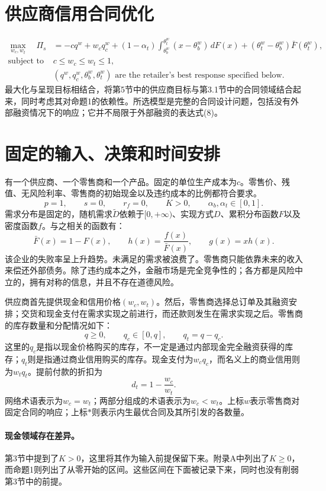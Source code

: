 \documentclass{article}
\begin{document}
\section*{供应商信用合同优化}
\begin{equation}
\begin{aligned}
\max_{w_c,w_t}\quad \Pi_s
&=-cq^w+w_cq_c^w
 +(1-\alpha_t)\int_{\theta_b^w}^{\theta_t^w}(x-\theta_b^w)\,dF(x)
 +(\theta_t^w-\theta_b^w)\bar F(\theta_t^w),\\
\text{subject to}\quad &c\leq w_c\leq w_t\leq 1,\\
&(q^w,q_c^w,\theta_b^w,\theta_t^w)
 \text{ are the retailer's best response specified below.}
\end{aligned}\tag{7}
\end{equation}
最大化与呈现目标相结合，将第5节中的供应商目标与第3.1节中的合同领域结合起来，同时考虑其对命题1的依赖性。所选模型是完整的合同设计问题，包括没有外部融资情况下的响应；它并不局限于外部融资的表达式(8)。

\section*{固定的输入、决策和时间安排}
有一个供应商、一个零售商和一个产品。固定的单位生产成本为$c$。零售价、残值、无风险利率、零售商的初始现金以及违约成本的比例都符合要求。
\[
p=1,\qquad s=0,\qquad r_f=0,\qquad K>0,\qquad
\alpha_b,\alpha_t\in[0,1].
\]
需求分布是固定的，随机需求$\widetilde D$依赖于$[0,+\infty)$、实现方式$D$、累积分布函数$F$以及密度函数$f$。与之相关的函数有：
\[
\bar F(x)=1-F(x),\qquad h(x)=\frac{f(x)}{\bar F(x)},\qquad
 g(x)=xh(x).
\]
该企业的失败率呈上升趋势。未满足的需求被浪费了。零售商只能依靠未来的收入来偿还外部债务。除了违约成本之外，金融市场是完全竞争性的；各方都是风险中立的，拥有对称的信息，并且不存在道德风险。

供应商首先提供现金和信用价格$(w_c,w_t)$。然后，零售商选择总订单及其融资安排；交货和现金支付在需求实现之前进行，而还款则发生在需求实现之后。零售商的库存数量和分配情况如下：
\[
q\geq0,\qquad q_c\in[0,q],\qquad q_t=q-q_c.
\]
这里的$q_c$是指以现金价格购买的库存，不一定是通过内部现金完全融资获得的库存；$q_t$则是指通过商业信用购买的库存。现金支付为$w_cq_c$，而名义上的商业信用则为$w_tq_t$。提前付款的折扣为
\[
d_t=1-\frac{w_c}{w_t}.
\]
网络术语表示为$w_c=w_t$；两部分组成的术语表示为$w_c<w_t$。上标$w$表示零售商对固定合同的响应；上标$*$则表示内生最优合同及其所引发的各数量。

\paragraph{现金领域存在差异。}
第3节中提到了$K>0$，这里将其作为输入前提保留下来。附录A中列出了$K\geq0$，而命题1则列出了从零开始的区间。这些区间在下面被记录下来，同时也没有削弱第3节中的前提。
\end{document}

